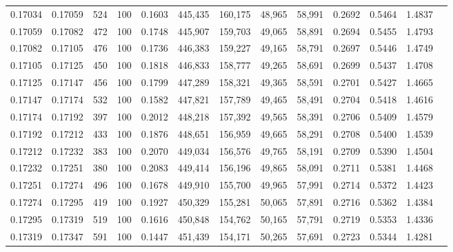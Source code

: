 \begin{tabular}{rrrrrrrrrrrrr}
0.17034 & 0.17059 &   524 & 100 &                                     0.1603 & 445,435 & 160,175 &  48,965 &  58,991 & 0.2692 & 0.5464 & 1.4837 \\
0.17059 & 0.17082 &   472 & 100 &                                     0.1748 & 445,907 & 159,703 &  49,065 &  58,891 & 0.2694 & 0.5455 & 1.4793 \\
0.17082 & 0.17105 &   476 & 100 &                                     0.1736 & 446,383 & 159,227 &  49,165 &  58,791 & 0.2697 & 0.5446 & 1.4749 \\
0.17105 & 0.17125 &   450 & 100 &                                     0.1818 & 446,833 & 158,777 &  49,265 &  58,691 & 0.2699 & 0.5437 & 1.4708 \\
0.17125 & 0.17147 &   456 & 100 &                                     0.1799 & 447,289 & 158,321 &  49,365 &  58,591 & 0.2701 & 0.5427 & 1.4665 \\
0.17147 & 0.17174 &   532 & 100 &                                     0.1582 & 447,821 & 157,789 &  49,465 &  58,491 & 0.2704 & 0.5418 & 1.4616 \\
0.17174 & 0.17192 &   397 & 100 &                                     0.2012 & 448,218 & 157,392 &  49,565 &  58,391 & 0.2706 & 0.5409 & 1.4579 \\
0.17192 & 0.17212 &   433 & 100 &                                     0.1876 & 448,651 & 156,959 &  49,665 &  58,291 & 0.2708 & 0.5400 & 1.4539 \\
0.17212 & 0.17232 &   383 & 100 &                                     0.2070 & 449,034 & 156,576 &  49,765 &  58,191 & 0.2709 & 0.5390 & 1.4504 \\
0.17232 & 0.17251 &   380 & 100 &                                     0.2083 & 449,414 & 156,196 &  49,865 &  58,091 & 0.2711 & 0.5381 & 1.4468 \\
0.17251 & 0.17274 &   496 & 100 &                                     0.1678 & 449,910 & 155,700 &  49,965 &  57,991 & 0.2714 & 0.5372 & 1.4423 \\
0.17274 & 0.17295 &   419 & 100 &                                     0.1927 & 450,329 & 155,281 &  50,065 &  57,891 & 0.2716 & 0.5362 & 1.4384 \\
0.17295 & 0.17319 &   519 & 100 &                                     0.1616 & 450,848 & 154,762 &  50,165 &  57,791 & 0.2719 & 0.5353 & 1.4336 \\
0.17319 & 0.17347 &   591 & 100 &                                     0.1447 & 451,439 & 154,171 &  50,265 &  57,691 & 0.2723 & 0.5344 & 1.4281 \\

\end{tabular}
